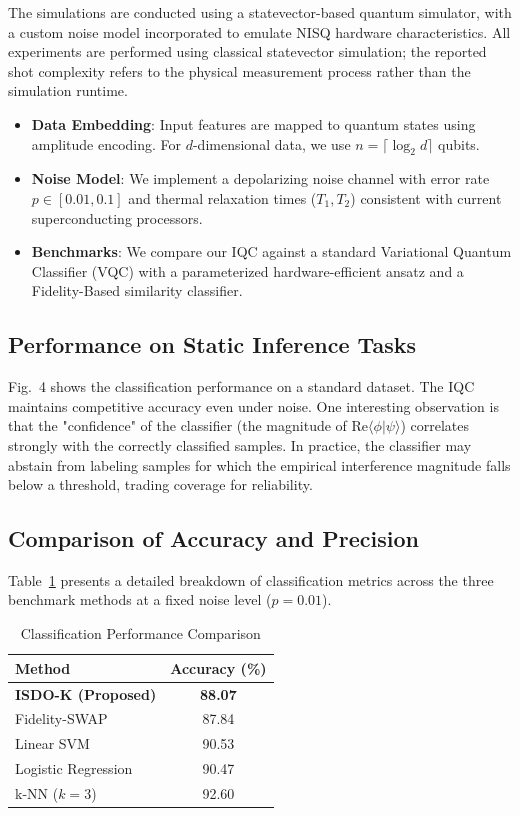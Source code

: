 \documentclass[conference]{IEEEtran}
\begin{document}
The simulations are conducted using a statevector-based quantum simulator, with a custom noise model incorporated to emulate NISQ hardware characteristics. All experiments are performed using classical statevector simulation; the reported shot complexity refers to the physical measurement process rather than the simulation runtime.
\begin{itemize}
    \item \textbf{Data Embedding}: Input features are mapped to quantum states using amplitude encoding. For $d$-dimensional data, we use $n = \lceil \log_2 d \rceil$ qubits.
    \item \textbf{Noise Model}: We implement a depolarizing noise channel with error rate $p \in [0.01, 0.1]$ and thermal relaxation times ($T_1, T_2$) consistent with current superconducting processors.
    \item \textbf{Benchmarks}: We compare our IQC against a standard Variational Quantum Classifier (VQC) with a parameterized hardware-efficient ansatz and a Fidelity-Based similarity classifier.
\end{itemize}

\subsection{Performance on Static Inference Tasks}

Fig.~4 shows the classification performance on a standard dataset. The IQC maintains competitive accuracy even under noise. One interesting observation is that the "confidence" of the classifier (the magnitude of $\text{Re}\langle \phi|\psi \rangle$) correlates strongly with the correctly classified samples. In practice, the classifier may abstain from labeling samples for which the empirical interference magnitude falls below a threshold, trading coverage for reliability.

\subsection{Comparison of Accuracy and Precision}

Table~\ref{tab:metrics} presents a detailed breakdown of classification metrics across the three benchmark methods at a fixed noise level ($p=0.01$).

\begin{table}[ht]
\centering
\caption{Classification Performance Comparison}
\label{tab:metrics}
\begin{tabular}{l c}
\toprule
Method & Accuracy (\%) \\
\midrule
\textbf{ISDO-K (Proposed)} & \textbf{88.07} \\
Fidelity-SWAP & 87.84 \\
Linear SVM & 90.53 \\
Logistic Regression & 90.47 \\
k-NN ($k=3$) & 92.60 \\
\bottomrule
\end{tabular}
\end{table}
\end{document}
